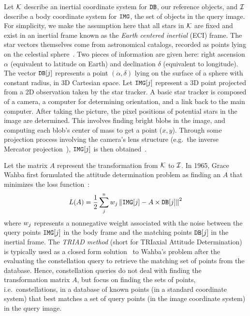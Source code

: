 Let $\mathcal{K}$ describe an inertial coordinate system for $\texttt{DB}$, our reference objects, and $\mathcal{I}$ describe a body coordinate system for $\texttt{IMG}$, the set of objects in the query image.
For simplicity, we make the assumption here that all stars in $\mathcal{K}$ are fixed and exist in an inertial frame known as the \textit{Earth centered inertial} (ECI) frame.
The star vectors themselves come from astronomical catalogs, recorded as points lying on the celestial sphere~\cite{tappe:starTrackerDevelopment}.
Two pieces of information are given here: right ascension $\alpha$ (equivalent to latitude on Earth) and declination $\delta$ (equivalent to longitude).
The vector $\texttt{DB}[j]$ represents a point $\left( \alpha, \delta \right)$ lying on the surface of a sphere with constant radius, in 3D Cartesian space.
Let $\texttt{IMG}[j]$ represent a 3D point projected from a 2D observation taken by the star tracker.
A basic star tracker is composed of a camera, a computer for determining orientation, and a link back to the main computer.
After taking the picture, the pixel positions of potential stars in the image are determined.
This involves finding bright blobs in the image, and computing each blob's center of mass to get a point ($x, y$).
Through some projection process involving the camera's lens structure (e.g.\ the inverse Mercator projection~\cite{weisstein:mercator}), $\texttt{IMG}[j]$ is then obtained~\cite{tappe:starTrackerDevelopment}.

Let the matrix $A$ represent the transformation from $\mathcal{K}$ to $\mathcal{I}$.
In 1965, Grace Wahba first formulated the attitude determination
problem as finding an $A$ that minimizes the loss function~\cite{wahba:attitudeEstimationProblem}:
\begin{equation}
    L(A) = \frac{1}{2} \sum_j^n w_j \left\| \texttt{IMG}[j] - A \times \texttt{DB}[j] \right\|^2
\end{equation}
where $w_j$ represents a nonnegative weight associated with the noise between the query points $\texttt{IMG}[j]$ in the body frame and the matching points $\texttt{DB}[j]$ in the inertial frame.
The \textit{TRIAD method} (short for TRIaxial Attitude Determination) is typically used as a closed form solution~\cite{markley:attitudeDeterminationTwoVectors} to Wahba's problem after the evaluating the constellation query to retrieve the matching set of points from the database.
Hence, constellation queries do not deal with finding the transformation matrix $A$, but focus on finding the sets of points, i.e.\ constellations, in a database of known points (in a standard coordinate system) that best matches a set of query points (in the image coordinate system) in the query image.

